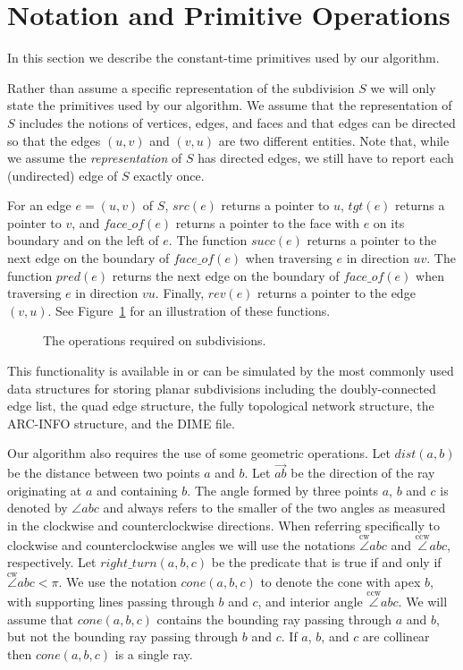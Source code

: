 \documentclass{article}
\newcommand{\centeripe}[1]{\begin{center}\Ipe{#1}\end{center}}
\newcommand{\seclabel}[1]{\label{sec:#1}}
\newcommand{\figlabel}[1]{\label{fig:#1}}
\newcommand{\figref}[1]{\mbox{Figure~\ref{fig:#1}}}
\newcommand{\dist}{\mathit{dist}}
\newcommand{\rev}{\mathit{rev}}
\newcommand{\scc}{\mathit{succ}}
\newcommand{\cwangle}{\stackrel{\mathrm{cw}}{\angle}}
\newcommand{\ccwangle}{\stackrel{\mathrm{ccw}}{\angle}}
\newcommand{\src}{\mathit{src}}
\newcommand{\tgt}{\mathit{tgt}}
\newcommand{\prd}{\mathit{pred}}
\newcommand{\rightturn}{\mathit{right\_turn}}
\newcommand{\face}{\mathit{face\_of}}
\newcommand{\cone}{\mathit{cone}}
\begin{document}
\section{Notation and Primitive Operations}\seclabel{dcel}

In this section we describe the constant-time primitives used by our
algorithm.

Rather than assume a specific representation of the subdivision $S$ we
will only state the primitives used by our algorithm.  We assume that
the representation of $S$ includes the notions of vertices, edges, and
faces and that edges can be directed so that the edges $(u,v)$ and
$(v,u)$ are two different entities. Note that, while we assume the
{\em representation} of $S$ has directed edges, we still have to
report each (undirected) edge of $S$ exactly once.

For an edge $e=(u,v)$ of $S$, $\src(e)$ returns a pointer to $u$,
$\tgt(e)$ returns a pointer to $v$, and $\face(e)$ returns a pointer
to the face with $e$ on its boundary and on the left of $e$.  The
function $\scc(e)$ returns a pointer to the next edge on the boundary
of $\face(e)$ when traversing $e$ in direction $uv$.  The function
$\prd(e)$ returns the next edge on the boundary of $\face(e)$ when
traversing $e$ in direction $vu$.  Finally, $\rev(e)$ returns a
pointer to the edge $(v,u)$.  See \figref{ops} for an illustration of
these functions.

\begin{figure}
\centeripe{ops}
\caption{The operations required on subdivisions.}
\figlabel{ops}
\end{figure}

This functionality is available in or can be simulated by the most
commonly used data structures for storing planar subdivisions
including the doubly-connected edge list,\cite{mp78,ps85} the quad
edge structure,\cite{gs85} the fully topological network structure,
\cite{b86} the ARC-INFO structure,\cite{pm90a} and the DIME
file.\cite{pm90b}

Our algorithm also requires the use of some geometric operations.  Let
$\dist(a,b)$ be the distance between two points $a$ and $b$.  Let
$\overrightarrow{ab}$ be the direction of the ray originating at $a$
and containing $b$. The angle formed by three points $a$, $b$ and $c$
is denoted by $\angle abc$ and always refers to the smaller of the two
angles as measured in the clockwise and counterclockwise directions.
When referring specifically to clockwise and counterclockwise angles
we will use the notations $\cwangle abc$ and $\ccwangle abc$,
respectively.  Let $\rightturn(a,b,c)$ be the predicate that is true
if and only if $\cwangle abc<\pi$.  We use the notation $\cone(a,b,c)$
to denote the cone with apex $b$, with supporting lines passing
through $b$ and $c$, and interior angle $\ccwangle abc$.  We will
assume that $\cone(a,b,c)$ contains the bounding ray passing through
$a$ and $b$, but not the bounding ray passing through $b$ and $c$.  If
$a$, $b$, and $c$ are collinear then $\cone(a,b,c)$ is a single ray.
\end{document}
